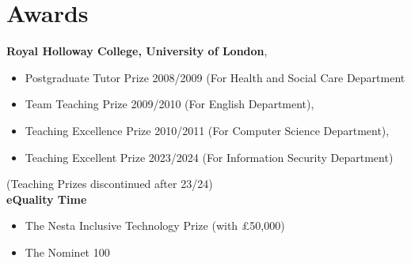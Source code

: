 \section{Awards}
{\textbf{Royal Holloway College, University of London}},
\begin{itemize}
\item {Postgraduate Tutor Prize 2008/2009 (For Health and Social Care Department}  
\item {Team Teaching Prize 2009/2010 (For English Department)}, 
\item {Teaching Excellence Prize 2010/2011 (For Computer Science Department)}, 
\item {Teaching Excellent Prize 2023/2024 (For Information Security Department)}
\end{itemize}
(Teaching Prizes discontinued after 23/24)\\
\vspace{1cm}
{\textbf{eQuality Time}}

\begin{itemize}
\item {The Nesta Inclusive Technology Prize (with £50,000)}
\item {The Nominet 100} 
\end{itemize}


